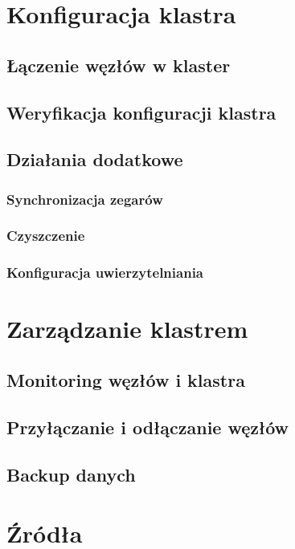 \documentclass{article}
\begin{document}
\section{Konfiguracja klastra}

\subsection{Łączenie węzłów w klaster}

\subsection{Weryfikacja konfiguracji klastra}

\subsection{Działania dodatkowe}

\subsubsection{Synchronizacja zegarów}

\subsubsection{Czyszczenie}

\subsubsection{Konfiguracja uwierzytelniania}

\section{Zarządzanie klastrem}

\subsection{Monitoring węzłów i klastra}

\subsection{Przyłączanie i odłączanie węzłów}

\subsection{Backup danych}

\section*{Źródła}
\end{document}
